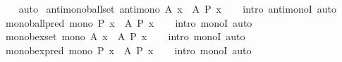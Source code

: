 \begin{isabellebody}
%
\isadelimproof
\ \ %
\endisadelimproof
%
\isatagproof
{}\isamarkupfalse%
\ auto%
\endisatagproof
{\isafoldproof}%
%
\isadelimproof
\isanewline
%
\endisadelimproof
\isanewline
{}\isamarkupfalse%
\ antimono{\isacharunderscore}{\kern0pt}ball{\isacharunderscore}{\kern0pt}set{\isacharcolon}{\kern0pt}\ {\isachardoublequoteopen}antimono\ {\isacharparenleft}{\kern0pt}{\isasymlambda}A{\isachardot}{\kern0pt}\ {\isasymforall}x\ {\isasymin}\ A{\isachardot}{\kern0pt}\ P\ x{\isacharparenright}{\kern0pt}{\isachardoublequoteclose}\isanewline
%
\isadelimproof
\ \ %
\endisadelimproof
%
\isatagproof
{}\isamarkupfalse%
\ {\isacharparenleft}{\kern0pt}intro\ antimonoI{\isacharparenright}{\kern0pt}\ auto%
\endisatagproof
{\isafoldproof}%
%
\isadelimproof
\isanewline
%
\endisadelimproof
\isanewline
{}\isamarkupfalse%
\ mono{\isacharunderscore}{\kern0pt}ball{\isacharunderscore}{\kern0pt}pred{\isacharcolon}{\kern0pt}\ {\isachardoublequoteopen}mono\ {\isacharparenleft}{\kern0pt}{\isasymlambda}P{\isachardot}{\kern0pt}\ {\isasymforall}x\ {\isasymin}\ A{\isachardot}{\kern0pt}\ P\ x{\isacharparenright}{\kern0pt}{\isachardoublequoteclose}\isanewline
%
\isadelimproof
\ \ %
\endisadelimproof
%
\isatagproof
{}\isamarkupfalse%
\ {\isacharparenleft}{\kern0pt}intro\ monoI{\isacharparenright}{\kern0pt}\ auto%
\endisatagproof
{\isafoldproof}%
%
\isadelimproof
\isanewline
%
\endisadelimproof
\isanewline
{}\isamarkupfalse%
\ mono{\isacharunderscore}{\kern0pt}bex{\isacharunderscore}{\kern0pt}set{\isacharcolon}{\kern0pt}\ {\isachardoublequoteopen}mono\ {\isacharparenleft}{\kern0pt}{\isasymlambda}A{\isachardot}{\kern0pt}\ {\isasymexists}x\ {\isasymin}\ A{\isachardot}{\kern0pt}\ P\ x{\isacharparenright}{\kern0pt}{\isachardoublequoteclose}\isanewline
%
\isadelimproof
\ \ %
\endisadelimproof
%
\isatagproof
{}\isamarkupfalse%
\ {\isacharparenleft}{\kern0pt}intro\ monoI{\isacharparenright}{\kern0pt}\ auto%
\endisatagproof
{\isafoldproof}%
%
\isadelimproof
\isanewline
%
\endisadelimproof
\isanewline
{}\isamarkupfalse%
\ mono{\isacharunderscore}{\kern0pt}bex{\isacharunderscore}{\kern0pt}pred{\isacharcolon}{\kern0pt}\ {\isachardoublequoteopen}mono\ {\isacharparenleft}{\kern0pt}{\isasymlambda}P{\isachardot}{\kern0pt}\ {\isasymexists}x\ {\isasymin}\ A{\isachardot}{\kern0pt}\ P\ x{\isacharparenright}{\kern0pt}{\isachardoublequoteclose}\isanewline
%
\isadelimproof
\ \ %
\endisadelimproof
%
\isatagproof
{}\isamarkupfalse%
\ {\isacharparenleft}{\kern0pt}intro\ monoI{\isacharparenright}{\kern0pt}\ auto%

\end{isabellebody}
